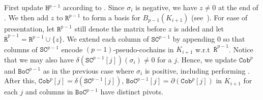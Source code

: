 \documentclass[10pt,a4paper]{amsart}
\newcommand {\mm}[1] {\ifmmode{#1}\else{\mbox{\(#1\)}}\fi}
\newcommand{\har}           {\mm{\mathbb{H}}}
\newcommand{\para}[1]{\vspace{2mm}\noindent{\textbf{\sffamily{#1}}}\hspace{4pt}}
\theoremstyle{definition}
\newcommand{\Tao}[1]{{\color{magenta}[#1]}}
\newcommand{\red}{\color{red}}
\newcommand{\fsimp}{\sigma}
\newcommand{\Bnd}{B}
\newcommand{\Real}{\mathbb{R}}
\newcommand{\Cobmat}{\mathtt{Cob}}
\newcommand{\Chnmat}{\mathtt{SC}}
\newcommand{\Bndmat}{\mathtt{BoC}}
\newcommand{\Harmat}{\mathtt{H}}
\newcommand{\Rmat}{\mathtt{R}}
\newcommand{\sG}{\sigma}
\newcommand{\dG}{\delta}
\let\bar\overline
\theoremstyle{remark}
\begin{document}


\para{$\sG_i$ is negative.}
First update $\Harmat^{p-1}$ 
according to .
Since $\fsimp_i$ is negative, 
we have $z\neq 0$ at the end of .
We then add $z$ to $\Rmat^{p-1}$ 
to form a basis for $\Bnd_{p-1}(K_{i+1})$
(see~\cite{DeyWang2022,EdelsbrunnerLetscherZomorodian2002}).
For ease of presentation, 
let $\Rmat^{p-1}$ still denote 
the matrix
before $z$ is added
and let $\bar{\Rmat}^{p-1}=\Rmat^{p-1}\cup\{z\}$.
We extend each column 
of $\Chnmat^{p-1}$
by appending 0
so that columns of $\Chnmat^{p-1}$
encode $(p-1)$-pseudo-cochains in $K_{i+1}$
w.r.t\ $\bar{\Rmat}^{p-1}$.
Notice that we may also have
$\dG(\Chnmat^{p-1}[j])(\fsimp_i)\neq 0$
for a $j$.
Hence,
we update 
$\Cobmat^p$ and $\Bndmat^{p-1}$
as in the previous case where $\fsimp_i$ is positive,
including performing .
After this, 
${\Cobmat}^p[j]=\dG(\Chnmat^{p-1}[j])$, ${\Bndmat}^{p-1}[j]=\partial({\Cobmat}^p[j])$
in $K_{i+1}$
for each $j$
and columns in ${\Bndmat}^{p-1}$ have distinct pivots.
\end{document}
